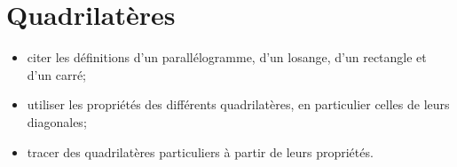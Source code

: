 \chapter{Quadrilatères}\label{ChQuadrilateres}
\begin{acquis} %
\begin{itemize}
\item citer les définitions d'un parallélogramme, d'un losange, d'un rectangle et d'un carré;
\item utiliser les propriétés des différents quadrilatères, en particulier celles de leurs diagonales;
\item tracer des quadrilatères particuliers à partir de leurs propriétés.
\end{itemize}
\end{acquis}

\activites



\cours


\exercicesbase
\begin{colonne*exercice}

\end{colonne*exercice}


\exercicesappr
\begin{colonne*exercice}

\end{colonne*exercice}

\connaissances


\TravauxPratiques %


\pagebreak

\recreation



